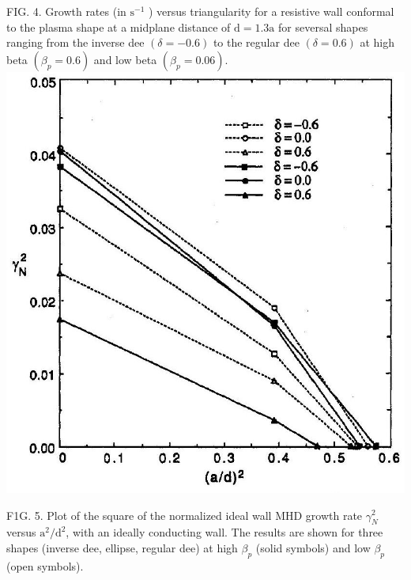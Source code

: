 \documentclass[10pt]{article}
\begin{document}
FIG. 4. Growth rates (in $\mathrm{s}^{-1}$ ) versus triangularity for a resistive wall conformal to the plasma shape at a midplane distance of $\mathrm{d}=1.3 \mathrm{a}$ for seversal shapes ranging from the inverse dee $(\delta=-0.6)$ to the regular dee $(\delta=0.6)$ at high beta $\left(\beta_{p}=0.6\right)$ and low beta $\left(\beta_{p}=0.06\right)$.\\
\includegraphics[max width=\textwidth, center]{2025_01_10_a0135324997886412d98g-6(1)}

F1G. 5. Plot of the square of the normalized ideal wall MHD growth rate $\gamma_{N}^{2}$ versus $\mathrm{a}^{2} / \mathrm{d}^{2}$, with an ideally conducting wall. The results are shown for three shapes (inverse dee, ellipse, regular dee) at high $\beta_{p}$ (solid symbols) and low $\beta_{p}$ (open symbols).
\end{document}
